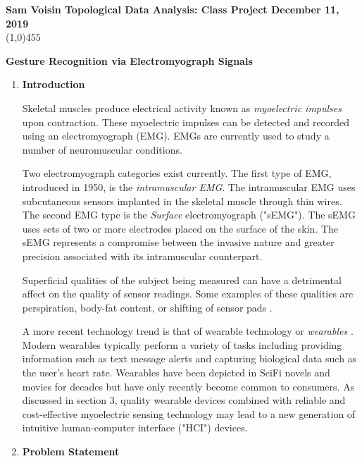 \documentclass[11pt]{article}
\begin{document}
\noindent \textbf{Sam Voisin \hfill  \textbf{Topological Data Analysis: Class Project}  \hfill  December 11, 2019} \\
\line(1,0){455}

\begin{center}
\Large{{\bf Gesture Recognition via Electromyograph Signals}}\\
\end{center}

\begin{enumerate}
\setlength{\parindent}{5ex}

\item \textbf{Introduction}

\noindent

Skeletal muscles produce electrical activity known as \emph{myoelectric impulses} upon contraction. These myoelectric impulses can be detected and recorded using an electromyograph (EMG). EMGs are currently used to study a number of neuromuscular conditions.

Two electromyograph categories exist currently. The first type of EMG, introduced in 1950, is the \emph{intramuscular EMG}. The intramuscular EMG uses subcutaneous sensors implanted in the skeletal muscle through thin wires. The second EMG type is the \emph{Surface} electromyograph ("sEMG"). The sEMG uses sets of two or more electrodes placed on the surface of the skin. The sEMG  represents a compromise between the invasive nature and greater precision associated with its intramuscular counterpart. 

Superficial qualities of the subject being measured can have a detrimental affect on the quality of sensor readings. Some examples of these qualities are perspiration, body-fat content, or shifting of sensor pads \cite{lobov}.

A more recent technology trend is that of wearable technology or \emph{wearables} \cite{wear}. Modern wearables typically perform a variety of tasks including providing information such as text message alerts and capturing biological data such as the user's heart rate. Wearables have been depicted in SciFi novels and movies for decades but have only recently become common to consumers. As discussed in section 3, quality wearable devices combined with reliable and cost-effective myoelectric sensing technology may lead to a new generation of intuitive human-computer interface ("HCI") devices.

\item \textbf{Problem Statement}


\end{enumerate}
\end{document}
